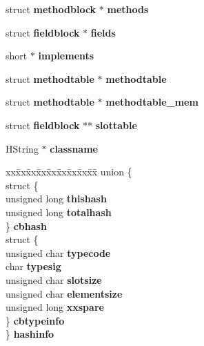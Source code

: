 \begin{DoxyCompactItemize}
\item 
struct {\bf methodblock} $\ast$ {\bfseries methods}\label{struct_classjava__lang___class_ad42f2f437b59e1f7cd771efd93115fca}

\item 
struct {\bf fieldblock} $\ast$ {\bfseries fields}\label{struct_classjava__lang___class_a9da6aaa5e1f3cb040e7645e10fe81ab9}

\item 
short $\ast$ {\bfseries implements}\label{struct_classjava__lang___class_ae05140f002d568501ea5a5007b5f002f}

\item 
struct {\bf methodtable} $\ast$ {\bfseries methodtable}\label{struct_classjava__lang___class_a610b43466d6583b889b7d6096699bff1}

\item 
struct {\bf methodtable} $\ast$ {\bfseries methodtable\_\-mem}\label{struct_classjava__lang___class_ab87fb556873ec39c1034494d77db8091}

\item 
struct {\bf fieldblock} $\ast$$\ast$ {\bfseries slottable}\label{struct_classjava__lang___class_a9e2dcbdcc9def53258333aaba139d380}

\item 
HString $\ast$ {\bfseries classname}\label{struct_classjava__lang___class_ab03185de3c2693ff86db2f8cf057a668}

\item 
\begin{tabbing}
xx\=xx\=xx\=xx\=xx\=xx\=xx\=xx\=xx\=\kill
union \{\\
\>struct \{\\
\>\>unsigned long {\bfseries thishash}\\
\>\>unsigned long {\bfseries totalhash}\\
\>\} {\bfseries cbhash}\\
\>struct \{\\
\>\>unsigned char {\bfseries typecode}\\
\>\>char {\bfseries typesig}\\
\>\>unsigned char {\bfseries slotsize}\\
\>\>unsigned char {\bfseries elementsize}\\
\>\>unsigned long {\bfseries xxspare}\\
\>\} {\bfseries cbtypeinfo}\\
\} {\bfseries hashinfo}\label{struct_classjava__lang___class_aa2a5edfb6eb5d15433f28a133e7e988e}
\\


\end{tabbing}
\end{DoxyCompactItemize}
